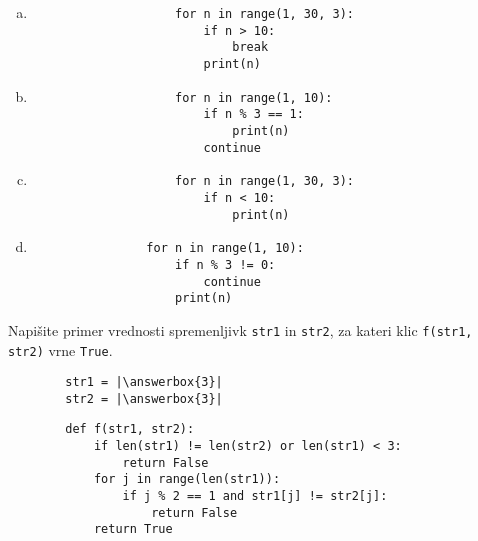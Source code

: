 \documentclass[arhiv, 10pt]{../izpit}
\newcommand{\inlinepy}[1]{\texttt{#1}}
\newcommand{\answerbox}[1]{\framebox{\vphantom{\large M}\hspace{#1cm}}}
\begin{document}
        \begin{multicols}{2}
        \begin{enumerate}[(a)]
\item 
                \begin{verbatim}
                    for n in range(1, 30, 3):
                        if n > 10:
                            break
                        print(n)
                \end{verbatim}
            
\item 
                \begin{verbatim}
                    for n in range(1, 10):
                        if n % 3 == 1:
                            print(n)
                        continue
                \end{verbatim}
            
\item 
                \begin{verbatim}
                    for n in range(1, 30, 3):
                        if n < 10:
                            print(n)
                \end{verbatim}
            
\item 
            \begin{verbatim}
                for n in range(1, 10):
                    if n % 3 != 0:
                        continue
                    print(n)
            \end{verbatim}
        
\end{enumerate}

        \end{multicols}
    
        \naloga*
        \begin{multicols}{2}
        \noindent
        Napišite primer vrednosti spremenljivk \inlinepy{str1} in \inlinepy{str2}, za kateri klic \inlinepy{f(str1, str2)} vrne \inlinepy{True}.
        \begin{verbatim}
        str1 = |\answerbox{3}|
        str2 = |\answerbox{3}|
        \end{verbatim}
        \vfil
        \columnbreak
        \begin{verbatim}
        def f(str1, str2):
            if len(str1) != len(str2) or len(str1) < 3:
                return False
            for j in range(len(str1)):
                if j % 2 == 1 and str1[j] != str2[j]:
                    return False
            return True
        \end{verbatim}
        \end{multicols}
    
\end{document}
